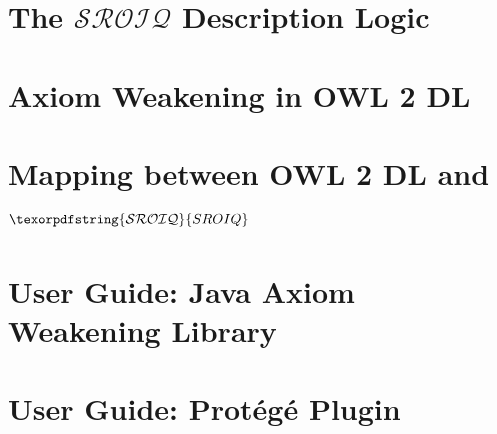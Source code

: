 \documentclass[10pt,a4paper]{report}
\theoremstyle{plain}
\theoremstyle{definition}
\theoremstyle{remark}
\newcommand{\SROIQ}{\ensuremath{\texorpdfstring{\mathcal{SROIQ}}{SROIQ}}\xspace}
\begin{document}


\printbibliography

\appendix

\chapter{The \texorpdfstring{$\mathcal{SROIQ}$}{SROIQ} Description Logic} \label{sroiq-appendix}



\chapter{Axiom Weakening in OWL 2 DL} \label{weakening-owl-2-dl}



\chapter{Mapping between OWL 2 DL and \SROIQ} \label{owl-to-sroiq}



\chapter{User Guide: Java Axiom Weakening Library} \label{guide-prototype}



\chapter{User Guide: Protégé Plugin} \label{guide-plugin}


\end{document}
